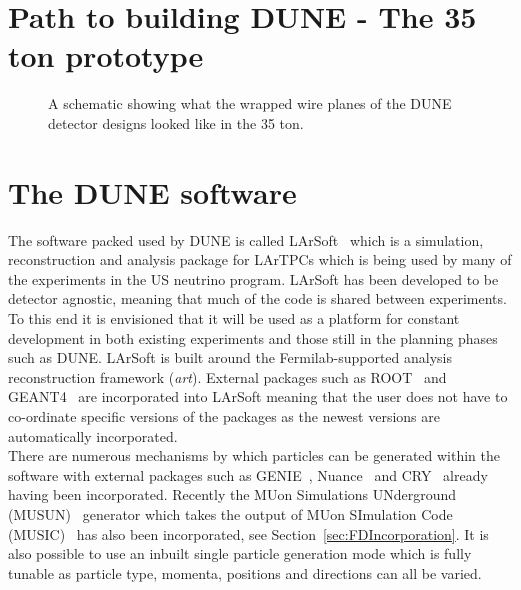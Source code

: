 \section{Path to building DUNE - The 35 ton prototype} \label{sec:The35tonDetector}  %

\begin{figure}[h]
  \centering
  \caption[The wrapped wires of the 35 ton]{A schematic showing what the wrapped wire planes of the DUNE detector designs looked like in the 35 ton.}
  \label{fig:35tonWireGeom}
\end{figure}

\section{The DUNE software} \label{sec:LArSoft} %
The software packed used by DUNE is called LArSoft~\citep{Church_LArSoft} which is a simulation, reconstruction and analysis package for LArTPCs which is being used by many of the experiments in the US neutrino program. LArSoft has been developed to be detector agnostic, meaning that much of the code is shared between experiments. To this end it is envisioned that it will be used as a platform for constant development in both existing experiments and those still in the planning phases such as DUNE. LArSoft is built around the Fermilab-supported analysis reconstruction framework (\emph{art}). External packages such as ROOT~\citep{ROOT} and GEANT4~\citep{GEANT4} are incorporated into LArSoft meaning that the user does not have to co-ordinate specific versions of the packages as the newest versions are automatically incorporated. \\

There are numerous mechanisms by which particles can be generated within the software with external packages such as GENIE~\citep{GENIE}, Nuance~\citep{Nuance} and CRY~\citep{CRY} already having been incorporated. Recently the MUon Simulations UNderground (MUSUN)~\citep{MUSUN} generator which takes the output of MUon SImulation Code (MUSIC)~\citep{MUSIC} has also been incorporated, see Section~\ref{sec:FDIncorporation}. It is also possible to use an inbuilt single particle generation mode which is fully tunable as particle type, momenta, positions and directions can all be varied. \\

